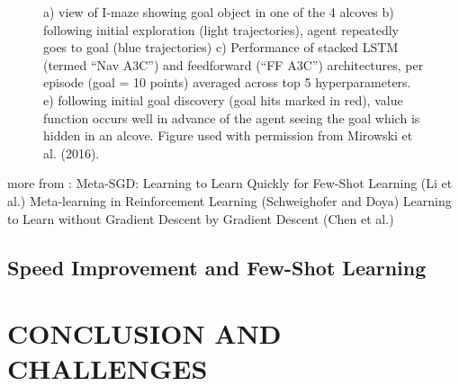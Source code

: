 \documentclass[letterpaper, 10 pt, conference]{ieeeconf}  %
\begin{document}
\begin{figure}[thpb]
        \centering
  \caption{a) view of I-maze showing goal object in one of the 4 alcoves b) following initial exploration
  (light trajectories), agent repeatedly goes to goal (blue trajectories) c) Performance of stacked LSTM (termed
  “Nav A3C”) and feedforward (“FF A3C”) architectures, per episode (goal = 10 points) averaged across top 5
  hyperparameters. e) following initial goal discovery (goal hits marked in red), value function occurs well in
  advance of the agent seeing the goal which is hidden in an alcove. Figure used with permission from Mirowski
  et al. (2016).
  }
        \label{figurelabel}
     \end{figure}

more from :  \newline
Meta-SGD: Learning to Learn Quickly for Few-Shot Learning (Li et al.) \newline
Meta-learning in Reinforcement Learning (Schweighofer and Doya) \newline
Learning to Learn without Gradient Descent by Gradient Descent (Chen et al.)

\subsection{Speed Improvement and Few-Shot Learning}

\section{CONCLUSION AND CHALLENGES}
\end{document}
